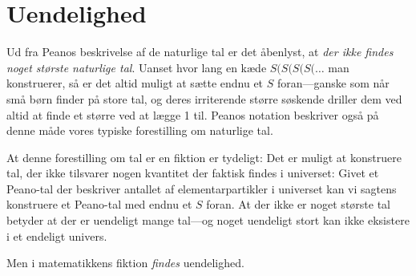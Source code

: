 \chapter{Uendelighed}
Ud fra Peanos beskrivelse af de naturlige tal er det åbenlyst, at \emph{der ikke findes noget største naturlige tal}. Uanset hvor lang en kæde $S(S(S(S(\ldots$ man konstruerer, så er det altid muligt at sætte endnu et $S$ foran---ganske som når små børn finder på store tal, og deres irriterende større søskende driller dem ved altid at finde et større ved at lægge 1 til. Peanos notation beskriver også på denne måde vores typiske forestilling om naturlige tal.

At denne forestilling om tal er en fiktion er tydeligt: Det er muligt at konstruere tal, der ikke tilsvarer nogen kvantitet der faktisk findes i universet: Givet et Peano-tal der beskriver antallet af elementarpartikler i universet kan vi sagtens konstruere et Peano-tal med endnu et $S$ foran. At der ikke er noget største tal betyder at der er uendeligt mange tal---og noget uendeligt stort kan ikke eksistere i et endeligt univers.

Men i matematikkens fiktion \emph{findes} uendelighed.